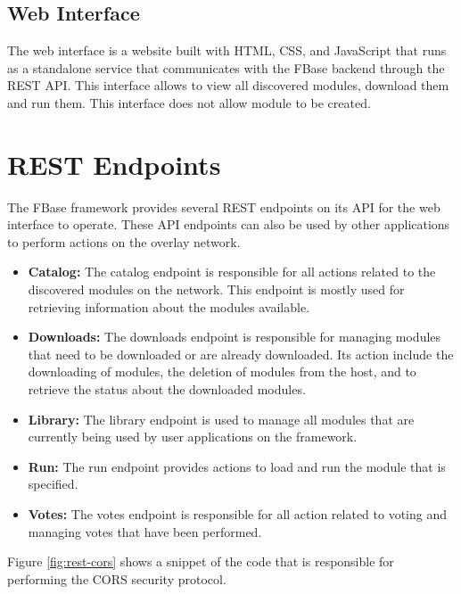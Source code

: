 \subsection{Web Interface}

The web interface is a website built with HTML, CSS, and JavaScript that runs as a standalone service that communicates with the FBase backend through the REST API. This interface allows to view all discovered modules, download them and run them. This interface does not allow module to be created.

\section{REST Endpoints}

The FBase framework provides several REST endpoints on its API for the web interface to operate. These API endpoints can also be used by other applications to perform actions on the overlay network.

\begin{itemize}
	\item \textbf{Catalog:} The catalog endpoint is responsible for all actions related to the discovered modules on the network. This endpoint is mostly used for retrieving information about the modules available.
	\item \textbf{Downloads:} The downloads endpoint is responsible for managing modules that need to be downloaded or are already downloaded. Its action include the downloading of modules, the deletion of modules from the host, and to retrieve the status about the downloaded modules.
	\item \textbf{Library:} The library endpoint is used to manage all modules that are currently being used by user applications on the framework.
	\item \textbf{Run:} The run endpoint provides actions to load and run the module that is specified.
	\item \textbf{Votes:} The votes endpoint is responsible for all action related to voting and managing votes that have been performed.
\end{itemize}

Figure \ref{fig:rest-cors} shows a snippet of the code that is responsible for performing the CORS security protocol.

